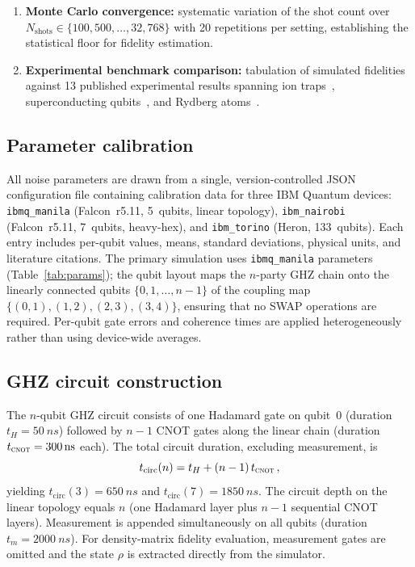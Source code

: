\documentclass[aip, amsmath, amssymb, preprint, longbibliography]{revtex4-2}
\newcommand{\cnot}{\textsc{cnot}}
\begin{document}
\begin{enumerate}
\item \textbf{Monte Carlo convergence:}
      systematic variation of the shot count over
      $N_{\text{shots}}\in\{100,500,\ldots,32{,}768\}$ with 20
      repetitions per setting, establishing the statistical floor for
      fidelity estimation.

\item \textbf{Experimental benchmark comparison:}
      tabulation of simulated fidelities against 13 published
      experimental results spanning ion traps~\cite{Monz2011},
      superconducting qubits~\cite{Song2019,Mooney2019,Wei2020},
      and Rydberg atoms~\cite{Omran2019}.
\end{enumerate}

\subsection{Parameter calibration}\label{sec:param_cal}

All noise parameters are drawn from a single, version-controlled JSON
configuration file containing calibration data for three IBM Quantum
devices: \texttt{ibmq\_manila} (Falcon~r5.11, 5~qubits, linear
topology), \texttt{ibm\_nairobi} (Falcon~r5.11, 7~qubits, heavy-hex),
and \texttt{ibm\_torino} (Heron, 133~qubits). Each entry includes
per-qubit values, means, standard deviations, physical units, and
literature citations. The primary simulation uses \texttt{ibmq\_manila}
parameters (Table~\ref{tab:params}); the qubit layout maps the $n$-party
GHZ chain onto the linearly connected qubits $\{0,1,\ldots,n{-}1\}$ of
the coupling map $\{(0,1),(1,2),(2,3),(3,4)\}$, ensuring that no SWAP
operations are required. Per-qubit gate errors and coherence times are
applied heterogeneously rather than using device-wide averages.

\subsection{GHZ circuit construction}\label{sec:circuit}

The $n$-qubit GHZ circuit consists of one Hadamard gate on qubit~0
(duration $t_H=\SI{50}{ns}$) followed by $n{-}1$ CNOT gates along the
linear chain (duration $t_{\cnot}=\SI{300}{ns}$ each). The total
circuit duration, excluding measurement, is
\begin{equation}
t_{\text{circ}}(n) = t_H + (n-1)\,t_{\cnot}\,,
\label{eq:circuit_time}
\end{equation}
yielding $t_{\text{circ}}(3)=\SI{650}{ns}$ and
$t_{\text{circ}}(7)=\SI{1850}{ns}$. The circuit depth on the linear
topology equals $n$ (one Hadamard layer plus $n{-}1$ sequential CNOT
layers). Measurement is appended simultaneously on all qubits
(duration $t_m=\SI{2000}{ns}$). For density-matrix fidelity evaluation,
measurement gates are omitted and the state $\rho$ is extracted directly
from the simulator.
\end{document}
